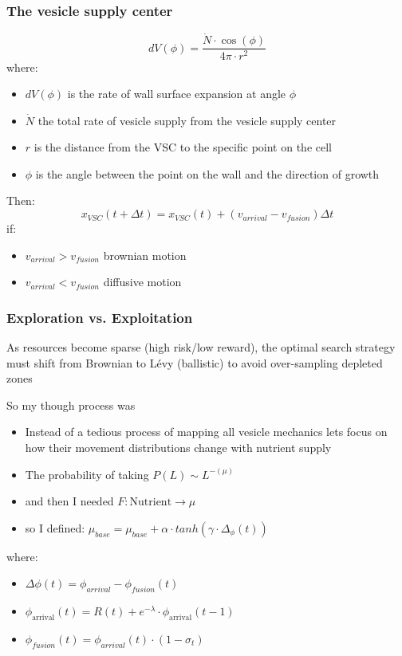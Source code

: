 \documentclass[10pt]{beamer}
\begin{document}
	\begin{frame}
		\frametitle{The vesicle supply center}
		\begin{equation}
			dV(\phi) = \frac{\dot{N} \cdot \cos(\phi)}{4\pi \cdot r^2}
			\end{equation}
			where:
			\begin{itemize}
				\item $dV(\phi)$ is the rate of wall surface expansion at angle $\phi$
				\item $\dot{N}$ the total rate of vesicle supply from the vesicle supply center
				\item $r$ is the distance from the VSC to the specific point on the cell
				\item $\phi$ is the angle between the point on the wall and the direction of growth
			\end{itemize}
			Then:
			\begin{equation}
				x_{VSC}(t + \Delta t) = x_{VSC}(t) + (v_{arrival} - v_{fusion}) \Delta t
			\end{equation}
			if:
			\begin{itemize}
				\item $v_{arrival} > v_{fusion}$ brownian motion
				\item $v_{arrival} < v_{fusion}$ diffusive motion
			\end{itemize}
	\end{frame}
	
	\begin{frame}
		\frametitle{Exploration vs. Exploitation}
		As resources become sparse (high risk/low reward), the optimal search strategy must shift from Brownian to Lévy (ballistic) to avoid over-sampling depleted zones \parencite{viswanathanOptimizingSuccessRandom1999}
		
		So my though process was
		\begin{itemize}
			\item Instead of a tedious process of mapping all vesicle mechanics lets focus on how their movement distributions change with nutrient supply
			\item The probability of taking $P(L) \sim L^{-(\mu)}$
			\item and then I needed $F: \text{Nutrient} \rightarrow \mu$
			\item so I defined: $\mu_{base} = \mu_{base} + \alpha \cdot tanh(\gamma \cdot \Delta_{\phi}(t))$
		\end{itemize}
		where:
		\begin{itemize}
			\item $\Delta \phi(t) = \phi_{arrival} - \phi_{fusion}(t)$
			\item $\phi_{\text{arrival}}(t) = R(t) + e^{-\lambda} \cdot \phi_{\text{arrival}}(t-1)$
			\item $\phi_{fusion}(t) = \phi_{arrival}(t) \cdot (1 - \sigma_{t})$
		\end{itemize}
	\end{frame}
	
\end{document}
